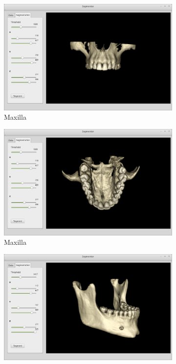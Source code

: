 \documentclass[11pt, b5paper]{article}
\begin{document}
\begin{figure}
    \centering
    \begin{subfigure}[b]{0.75\textwidth}
        \centering
        \includegraphics[width=\textwidth]{C5U1}
        \caption{Maxilla}
        \label{Fig:C5U1}
    \end{subfigure}
    \hfill
    \begin{subfigure}[b]{0.75\textwidth}
        \centering
        \includegraphics[width=\textwidth]{C5U2}
        \caption{Maxilla}
         \label{Fig:C5U2}
    \end{subfigure}
    \hfill
    \begin{subfigure}[b]{0.75\textwidth}
        \centering
        \includegraphics[width=\textwidth]{C5L}

\end{subfigure}
\end{figure}
\end{document}
